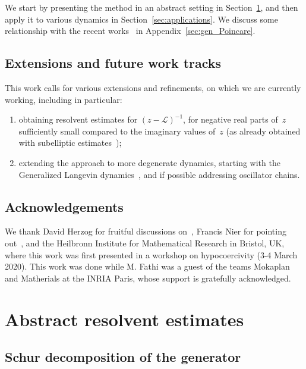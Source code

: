 \documentclass[10pt]{amsart}
\theoremstyle{definition}\newtheorem{defi}[theo]{Definition}\newtheorem{rema}[theo]{Remark}\newtheorem{exam}[theo]{Example}\newtheorem{exem}[theo]{Example}\newtheorem{nota}[theo]{Notation}
\newcommand{\cL}{\mathcal{L}}
\newcommand*{\romanenumi}{\renewcommand*{\theenumi}{\roman{enumi}}}
\begin{document}
We start by presenting the method in an abstract setting in Section~\ref{sec:abstract}, and then apply it to various dynamics in Section~\ref{sec:applications}. We discuss some relationship with the recent works~\cite{AM19,CLW19} in Appendix~\ref{sec:gen_Poincare}.

\subsection*{Extensions and future work tracks}
This work calls for various extensions and refinements, on which we are currently working, including in particular:
\begin{enumerate}\romanenumi
\item obtaining resolvent estimates for $(z -\cL)^{-1}$, for negative real parts of~$z$ sufficiently small compared to the imaginary values of~$z$ (as already obtained with subelliptic estimates~\cite{EH03,HN04,HN05});
\item extending the approach to more degenerate dynamics, starting with the Generalized Langevin dynamics~\cite{OP11}, and if possible addressing oscillator chains.
\end{enumerate}

\subsection*{Acknowledgements}
We thank David Herzog for fruitful discussions on~\cite{AM19,CLW19}, Francis Nier for pointing out~\cite{SZ07}, and the Heilbronn Institute for Mathematical Research in Bristol, UK, where this work was first presented in a workshop on hypocoercivity (3-4 March 2020). This work was done while M. Fathi was a guest of the teams Mokaplan and Matherials at the INRIA Paris, whose support is gratefully acknowledged.

\section{Abstract resolvent estimates}\label{sec:abstract}

\subsection{Schur decomposition of the generator}
\end{document}
